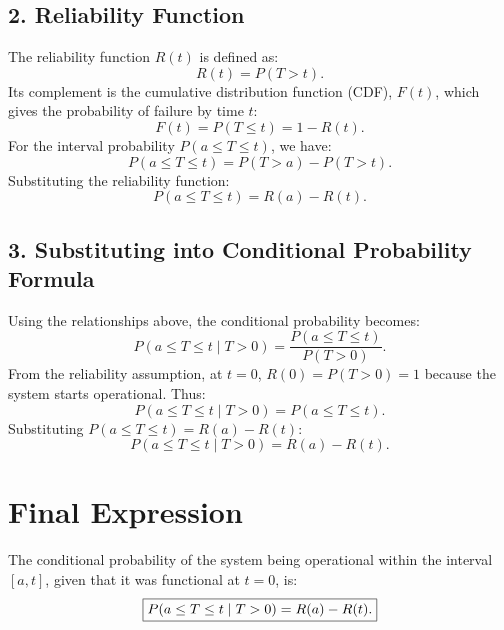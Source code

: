 \documentclass[12pt]{article}
\begin{document}
	\subsection*{2. Reliability Function}
	The reliability function $R(t)$ is defined as:
	\begin{equation}
		R(t) = P(T > t).
	\end{equation}
	Its complement is the cumulative distribution function (CDF), $F(t)$, which gives the probability of failure by time $t$:
	\begin{equation}
		F(t) = P(T \leq t) = 1 - R(t).
	\end{equation}
	For the interval probability $P(a \leq T \leq t)$, we have:
	\begin{equation}
		P(a \leq T \leq t) = P(T > a) - P(T > t).
	\end{equation}
	Substituting the reliability function:
	\begin{equation}
		P(a \leq T \leq t) = R(a) - R(t).
	\end{equation}
	
	\subsection*{3. Substituting into Conditional Probability Formula}
	Using the relationships above, the conditional probability becomes:
	\begin{equation}
		P(a \leq T \leq t \mid T > 0) = \frac{P(a \leq T \leq t)}{P(T > 0)}.
	\end{equation}
	From the reliability assumption, at $t = 0$, $R(0) = P(T > 0) = 1$ because the system starts operational. Thus:
	\begin{equation}
		P(a \leq T \leq t \mid T > 0) = P(a \leq T \leq t).
	\end{equation}
	Substituting $P(a \leq T \leq t) = R(a) - R(t)$:
	\begin{equation}
		P(a \leq T \leq t \mid T > 0) = R(a) - R(t).
	\end{equation}
	
	\section*{Final Expression}
	The conditional probability of the system being operational within the interval $[a, t]$, given that it was functional at $t = 0$, is:
	\begin{equation}
		\fbox{$P(a \leq T \leq t \mid T > 0) = R(a) - R(t).$}
	\end{equation}
	\newpage
	
\end{document}
